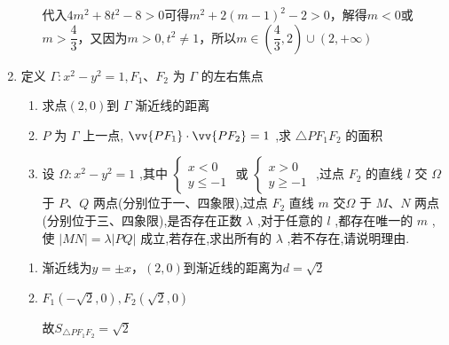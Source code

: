 \begin{enumerate}
\begin{jieda}
\begin{enumerate}
            代入$4m^2+8t^2-8 > 0$可得$m^2+2(m-1)^2-2>0$，解得$m < 0$或$m > \dfrac{4}{3}$，又因为$m > 0, t^2 \neq 1$，所以$m \in \left(\dfrac{4}{3}, 2\right) \cup (2, +\infty)$
        \end{enumerate}
    \end{jieda}
    \item 定义 $\Gamma  : {x}^{2} - {y}^{2} = 1,{F}_{1}\text{、}{F}_{2}$ 为 $\Gamma$ 的左右焦点 
    \begin{enumerate}
        \item 求点$(2,0)$到 $\Gamma$ 渐近线的距离
        \item ${P}$ 为 $\Gamma$ 上一点, $\vv{P{F}_{1}} \cdot  \vv{P{F}_{2}} = 1$ ,求 $\bigtriangleup P{F}_{1}{F}_{2}$ 的面积
        \item 设 $\Omega  : {x}^{2} - {y}^{2} = 1$ ,其中 $\left\{  \begin{array}{l} x < 0 \\  y \leq   - 1 \end{array}\right.$ 或 $\left\{  \begin{array}{l} x > 0 \\  y \geq   - 1 \end{array}\right.$ ,过点 ${F}_{2}$ 的直线 $l$ 交 $\Omega$ 于 $P\text{、}Q$ 两点(分别位于一、四象限),过点 ${F}_{2}$ 直线 $m$ 交$\Omega$ 于 $M\text{、}N$ 两点 (分别位于三、四象限),是否存在正数 $\lambda$ ,对于任意的 $l$ ,都存在唯一的 $m$ ,使 $\left| {MN}\right|  = \lambda \left| {PQ}\right|$ 成立,若存在,求出所有的 $\lambda$ ,若不存在,请说明理由.
    \end{enumerate}
    \begin{jieda}
        \begin{enumerate}
            \item 渐近线为$y = \pm x$，$(2, 0)$到渐近线的距离为$d = \sqrt{2}$
            \item $F_1(-\sqrt{2}, 0), F_2(\sqrt{2}, 0)$
            \begin{dingautolist}{172}
                \item 设$P(x_0, y_0)$，$\vv{PF_1} \cdot \vv{PF_2} = |\vv{OP}|^2 - 2 = 1$，故$\left\{\begin{array}{l}
                     x_0^2 + y_0^2 = 3 \\
                     x_0^2 - y_0^2 = 1
                \end{array}\right.$，故$y_0 = \pm 1$
                \item 设$P\left(\dfrac{1}{cos\theta}, tan\theta\right), \theta \in \left[0, 2\pi\right)$且$\theta \neq \dfrac{\pi}{2}, \dfrac{3\pi}{2}$，则$\vv{PF_1} = \left(-\sqrt{2} - \dfrac{1}{cos\theta}, -tan\theta\right)$，$\vv{PF_2} = \left(\sqrt{2} - \dfrac{1}{cos\theta}, -tan\theta\right)$，$1 = \vv{PF_1} \cdot \vv{PF_2} = \dfrac{1}{cos^2\theta} - 2 + tan^2\theta$，即$3cos^2\theta = 1 + sin^2\theta$，即$cos^2\theta = \dfrac{1}{2}$，故$y_P = \pm 1$
            \end{dingautolist}
            故$S_{\triangle{PF_1F_2}} = \sqrt{2}$
            

\end{enumerate}
\end{jieda}
\end{enumerate}
